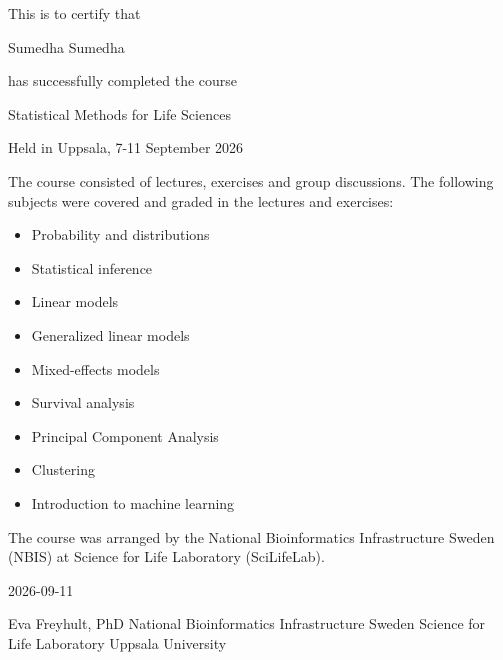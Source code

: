 \documentclass[12pt]{article}\usepackage[]{graphicx}\usepackage[]{color}
\newcommand{\courseName}{Statistical Methods for Life Sciences}
\newcommand{\courseLocation}{in Uppsala}
\newcommand{\courseDate}{7-11 September 2026}
\newcommand{\courseLastDay}{2026-09-11}
\newcommand{\courseExaminer}{Eva Freyhult, PhD}
\begin{document}
\large
This is to certify that 


\LARGE
Sumedha	Sumedha

\large
has successfully completed the course \newline

\LARGE
\begin{center}{\courseName}  \end{center} 


\large
\begin{center} Held  {\courseLocation}, {\courseDate} \end{center} 

\vspace{7mm}
\normalsize
The course consisted of lectures, exercises and group discussions. The following subjects were covered and graded  in the lectures and exercises:
\begin{itemize}
  \item Probability and distributions
  \item Statistical inference
  \item Linear models
  \item Generalized linear models
  \item Mixed-effects models
  \item Survival analysis
  \item Principal Component Analysis
  \item Clustering
  \item Introduction to machine learning
\end{itemize}



\vspace{8mm}
The course was arranged by the National Bioinformatics Infrastructure Sweden (NBIS) at Science for Life Laboratory (SciLifeLab).


\vspace{8mm}
 {\courseLastDay}
\vspace{22mm}


{\courseExaminer} \newline
\small
National Bioinformatics Infrastructure Sweden \newline
Science for Life Laboratory \newline
Uppsala University \newline
\end{document}
